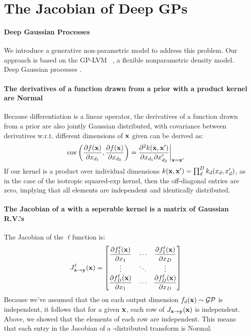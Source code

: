 \documentclass{article}
\newcommand{\Jx}{J_{\vx \rightarrow \vy}}
\newcommand{\Jxx}{J_{\vx \rightarrow \vy}(\vx)}
\begin{document}
\section{The Jacobian of Deep GPs}

\paragraph{Deep Gaussian Processes}
We introduce a generative non-parametric model to address this problem.  Our approach is based on the GP-LVM ~\cite{lawrence2004gaussian,salzmann2008local,lawrence2009non}, a flexible nonparametric density model.  Deep Gaussian processes \cite{damianou2012deep}.


\paragraph{The derivatives of a function drawn from a \gp{} prior with a product kernel are \iid Normal}

Because differentiation is a linear operator, the derivatives of a function drawn from a \gp{} prior are also jointly Gaussian distributed, with covariance between derivatives w.r.t. different dimensions of ${\bf{x}}$ given can be derived \citep{Solak03derivativeobservations} as:
%
\begin{align}
\operatorname{cov} \left( \frac{\partial f({\bf{x}})}{\partial x_{d_1}}, \frac{\partial f({\bf{x}})}{\partial x_{d_2}} \right) 
= \frac{\partial^2 k({\bf{x}}, {\bf{x}}')}{\partial x_{d_1} \partial x_{d_2}'} \bigg|_{{\bf{x}}={\bf{x}}'}
\end{align}
%
If our kernel is a product over individual dimensions $k({\bf{x}}, {\bf{x}}') = \prod_d^D k_d(x_d, x_d')$, as in the case of the isotropic squared-exp kernel, then the off-diagonal entries are zero, implying that all elements are independent and identically distributed.

\paragraph{The Jacobian of a \gp{} with a seperable kernel is a matrix of \iid Gaussian R.V.'s}

The Jacobian of the $\ell$\asdf function is:
%
\begin{align}
\Jx^\ell(\vx) =\begin{bmatrix} \dfrac{\partial f^\ell_1 (\vx) }{\partial x_1} & \cdots & \dfrac{\partial f^\ell_1 (\vx)}{\partial x_D} \\ \vdots & \ddots & \vdots \\ \dfrac{\partial f^\ell_D (\vx)}{\partial x_1} & \cdots & \dfrac{\partial f^\ell_D (\vx)}{\partial x_D}  \end{bmatrix}
\end{align}
%
Because we've assumed that the \gp{} on each output dimension $f_d({\bf{x}}) \sim \mathcal{GP}$ is independent, it follows that for a given ${\bf{x}}$, each row of $\Jxx$ is independent.
Above, we showed that the elements of each row are independent.
This means that each entry in the Jacobian of a \gp{}-distributed transform is \iid Normal.
\end{document}
